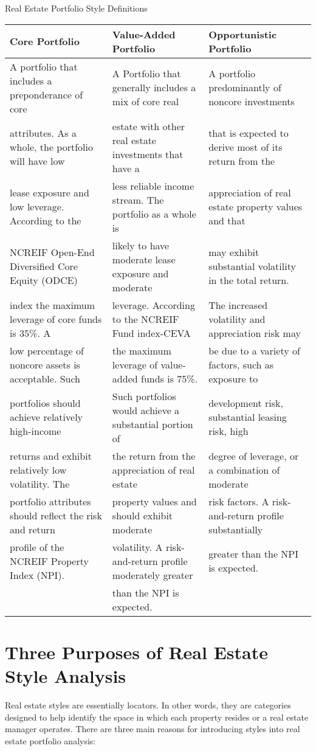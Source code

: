 \documentclass[11pt]{article}
\begin{document}
Real Estate Portfolio Style Definitions

\begin{center}
\begin{tabular}{|lll|}
\hline
Core Portfolio & Value-Added Portfolio & Opportunistic Portfolio \\
\hline
A portfolio that includes a preponderance of core & A Portfolio that generally includes a mix of core real & A portfolio predominantly of noncore investments \\
attributes. As a whole, the portfolio will have low & estate with other real estate investments that have a & that is expected to derive most of its return from the \\
lease exposure and low leverage. According to the & less reliable income stream. The portfolio as a whole is & appreciation of real estate property values and that \\
NCREIF Open-End Diversified Core Equity (ODCE) & likely to have moderate lease exposure and moderate & may exhibit substantial volatility in the total return. \\
index the maximum leverage of core funds is 35\%. A & leverage. According to the NCREIF Fund index-CEVA & The increased volatility and appreciation risk may \\
low percentage of noncore assets is acceptable. Such & the maximum leverage of value-added funds is 75\%. & be due to a variety of factors, such as exposure to \\
portfolios should achieve relatively high-income & Such portfolios would achieve a substantial portion of & development risk, substantial leasing risk, high \\
returns and exhibit relatively low volatility. The & the return from the appreciation of real estate & degree of leverage, or a combination of moderate \\
portfolio attributes should reflect the risk and return & property values and should exhibit moderate & risk factors. A risk-and-return profile substantially \\
profile of the NCREIF Property Index (NPI). & volatility. A risk-and-return profile moderately greater & greater than the NPI is expected. \\
 & than the NPI is expected. &  \\
\end{tabular}
\end{center}

\section*{Three Purposes of Real Estate Style Analysis}
Real estate styles are essentially locators. In other words, they are categories designed to help identify the space in which each property resides or a real estate manager operates. There are three main reasons for introducing styles into real estate portfolio analysis:
\end{document}
